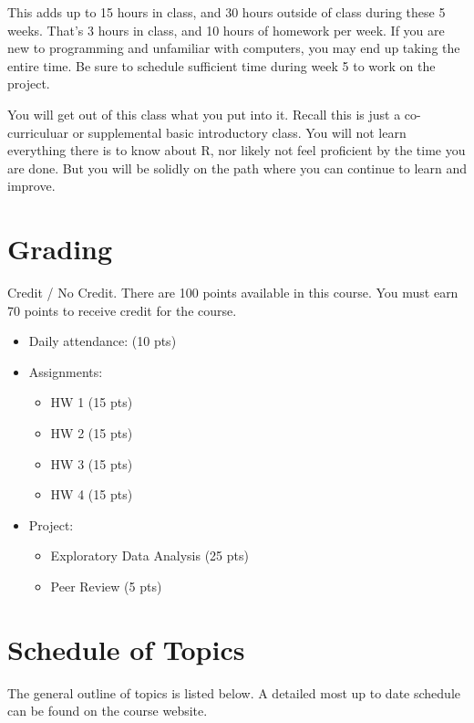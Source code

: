 \documentclass[
  11pt,
]{article}
\providecommand{\tightlist}{%
  \setlength{\itemsep}{0pt}\setlength{\parskip}{0pt}}
\begin{document}
This adds up to 15 hours in class, and 30 hours outside of class during
these 5 weeks. That's 3 hours in class, and 10 hours of homework per
week. If you are new to programming and unfamiliar with computers, you
may end up taking the entire time. Be sure to schedule sufficient time
during week 5 to work on the project.

You will get out of this class what you put into it. Recall this is just
a co-curriculuar or supplemental basic introductory class. You will not
learn everything there is to know about R, nor likely not feel
proficient by the time you are done. But you will be solidly on the path
where you can continue to learn and improve.

\hypertarget{grading}{%
\section{Grading}\label{grading}}

Credit / No Credit. There are 100 points available in this course. You
must earn 70 points to receive credit for the course.

\begin{itemize}
\tightlist
\item
  Daily attendance: (10 pts)
\item
  Assignments:

  \begin{itemize}
  \tightlist
  \item
    HW 1 (15 pts)
  \item
    HW 2 (15 pts)
  \item
    HW 3 (15 pts)
  \item
    HW 4 (15 pts)
  \end{itemize}
\item
  Project:

  \begin{itemize}
  \tightlist
  \item
    Exploratory Data Analysis (25 pts)
  \item
    Peer Review (5 pts)
  \end{itemize}
\end{itemize}

\hypertarget{schedule-of-topics}{%
\section{Schedule of Topics}\label{schedule-of-topics}}

The general outline of topics is listed below. A detailed most up to
date schedule can be found on the course website.
\end{document}
